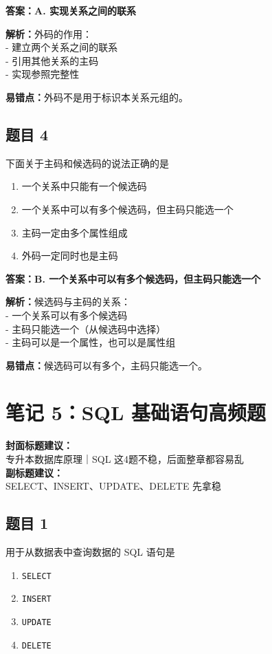 \documentclass[12pt,a4paper]{ctexart}
\begin{document}
\begin{answerbox}
	\textbf{答案：A. 实现关系之间的联系}

	\textbf{解析：}外码的作用：\\
	- 建立两个关系之间的联系\\
	- 引用其他关系的主码\\
	- 实现参照完整性

	\textbf{易错点：}外码不是用于标识本关系元组的。
\end{answerbox}

\subsection*{题目 4}
下面关于主码和候选码的说法正确的是
\begin{enumerate}[label=\Alph*.]
	\item 一个关系中只能有一个候选码
	\item 一个关系中可以有多个候选码，但主码只能选一个
	\item 主码一定由多个属性组成
	\item 外码一定同时也是主码
\end{enumerate}

\begin{answerbox}
	\textbf{答案：B. 一个关系中可以有多个候选码，但主码只能选一个}

	\textbf{解析：}候选码与主码的关系：\\
	- 一个关系可以有多个候选码\\
	- 主码只能选一个（从候选码中选择）\\
	- 主码可以是一个属性，也可以是属性组

	\textbf{易错点：}候选码可以有多个，主码只能选一个。
\end{answerbox}

\newpage

\section{笔记 5：SQL 基础语句高频题}
\begin{coverbox}
	\textbf{封面标题建议：}\\
	专升本数据库原理｜SQL 这4题不稳，后面整章都容易乱\\
	\textbf{副标题建议：}\\
	SELECT、INSERT、UPDATE、DELETE 先拿稳
\end{coverbox}

\subsection*{题目 1}
用于从数据表中查询数据的 SQL 语句是
\begin{enumerate}[label=\Alph*.]
	\item \texttt{SELECT}
	\item \texttt{INSERT}
	\item \texttt{UPDATE}
	\item \texttt{DELETE}
\end{enumerate}
\end{document}
